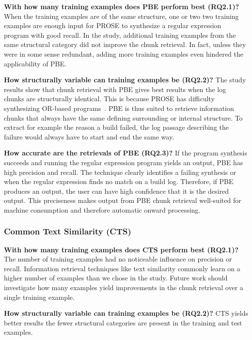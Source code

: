 \noindent
\textbf{With how many training examples does PBE perform best (RQ2.1)?}
When the training examples are of the same structure, one or two
two training examples are enough input for PROSE to synthesize a regular
expression program with good recall.
In the study, additional training
examples from the same structural category
did not improve the chunk retrieval.
In fact, unless they
were in some sense redundant, adding more training examples even
hindered the applicability of PBE.

\noindent
\textbf{How structurally variable can training examples be (RQ2.2)?}
The study results show that chunk retrieval with PBE gives best
results when the log chunks are structurally identical.
This is
because PROSE has difficulty synthesizing OR-based
programs~\cite{mayer2015user}.
PBE is thus suited to retrieve information
chunks that always have the same defining surrounding or internal
structure.
To extract for example the reason a build failed, the log
passage describing the failure would always have to start and
end the same way.

\noindent
\textbf{How accurate are the retrievals of PBE (RQ2.3)?}
If the program synthesis succeeds and running the regular expression
program yields an output, PBE has high precision and recall.
The technique
clearly identifies a failing synthesis or when the regular expression
finds no match on a build log.
Therefore, if PBE produces
an output, the user can have high confidence that it is the desired
output.
This preciseness makes output from PBE chunk retrieval
well-suited for machine consumption and therefore automatic onward
processing.

\subsubsection{Common Text Similarity (CTS)}

\noindent
\textbf{With how many training examples does CTS perform best (RQ2.1)?}
The number of training examples had no noticeable influence on
precision or recall.
Information retrieval techniques
like text similarity commonly learn on a higher number of examples
than we chose in the study.
Future work should investigate how many
examples yield improvements in the chunk retrieval over a single
training example.

\noindent
\textbf{How structurally variable can training examples be (RQ2.2)?}
CTS yields better results the
fewer structural categories are present in the training and test
examples.

